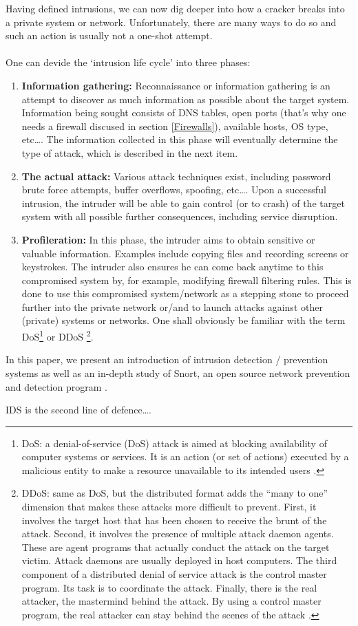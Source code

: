 Having defined intrusions, we can now dig deeper into how a cracker breaks into a private system or network. Unfortunately, there are many ways to do so and such an action is usually not a one-shot attempt. \\ \\
One can devide the `intrusion life cycle' into three phases:
\begin{enumerate}
\item \textbf{Information gathering:} Reconnaissance or information gathering is an attempt to discover as much information as possible about the target system. Information being sought consists of DNS tables, open ports (that's why one needs a firewall discused in section \ref{Firewalls}), available hosts, OS type, etc\ldots. The information collected in this phase will eventually determine the type of attack, which is described in the next item.
\item \textbf{The actual attack:} Various attack techniques exist, including password brute force attempts, buffer overflows, spoofing, etc\ldots. Upon a successful intrusion, the intruder will be able to gain control (or to crash) of the target system with all possible further consequences, including service disruption.
\item \textbf{Profileration:} In this phase, the intruder aims to obtain sensitive or valuable information. Examples include copying files and recording screens or keystrokes. The intruder also ensures he can come back anytime to this compromised system by, for example, modifying firewall filtering rules. This is done to use this compromised system/network as a stepping stone to proceed further into the private network or/and to launch attacks against other (private) systems or networks. One shall obviously be familiar with the term DoS\footnote{DoS: a denial-of-service (DoS) attack is aimed at blocking availability of computer systems or services. It is an action (or set of actions) executed by a malicious entity to make a resource unavailable to its intended users \citep{Dos}.} or DDoS \footnote{DDoS: same as DoS, but the distributed format adds the ``many to one'' dimension that makes these attacks more difficult to prevent. First, it involves the target host that has been chosen to receive the brunt of the attack. Second, it involves the presence of multiple attack daemon agents. These are agent programs that actually conduct the attack on the target victim. Attack
daemons are usually deployed in host computers. The third component of a distributed denial of service attack is the control master program. Its task is to coordinate the attack.
Finally, there is the real attacker, the mastermind behind the attack. By using a control master program, the real attacker can stay behind the scenes of the attack \citep{Ddos}.}.
\end{enumerate}

In this paper, we present an introduction of intrusion detection / prevention systems as well as an in-depth study of Snort, an open source network prevention and detection program \citep{Snort}.

IDS is the second line of defence\ldots.